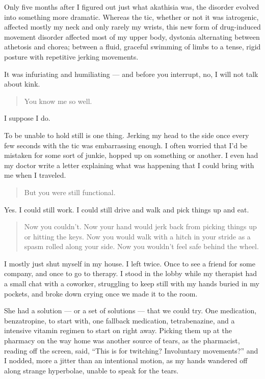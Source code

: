 Only five months after I figured out just what akathisia was, the disorder evolved into something more dramatic. Whereas the tic, whether or not it was iatrogenic, affected mostly my neck and only rarely my wrists, this new form of drug-induced movement disorder affected most of my upper body, dystonia alternating between athetosis and chorea; between a fluid, graceful swimming of limbs to a tense, rigid posture with repetitive jerking movements.

It was infuriating and humiliating --- and before you interrupt, no, I will not talk about kink.

\begin{quote}
You know me so well.
\end{quote}

I suppose I do.

To be unable to hold still is one thing. Jerking my head to the side once every few seconds with the tic was embarrassing enough. I often worried that I'd be mistaken for some sort of junkie, hopped up on something or another. I even had my doctor write a letter explaining what was happening that I could bring with me when I traveled.

\begin{quote}
But you were still functional.
\end{quote}

Yes. I could still work. I could still drive and walk and pick things up and eat.

\begin{quote}
Now you couldn't. Now your hand would jerk back from picking things up or hitting the keys. Now you would walk with a hitch in your stride as a spasm rolled along your side. Now you wouldn't feel safe behind the wheel.
\end{quote}

I mostly just shut myself in my house. I left twice. Once to see a friend for some company, and once to go to therapy. I stood in the lobby while my therapist had a small chat with a coworker, struggling to keep still with my hands buried in my pockets, and broke down crying once we made it to the room.

She had a solution --- or a set of solutions --- that we could try. One medication, benzatropine, to start with, one fallback medication, tetrabenazine, and a intensive vitamin regimen to start on right away. Picking them up at the pharmacy on the way home was another source of tears, as the pharmacist, reading off the screen, said, ``This is for twitching? Involuntary movements?'' and I nodded, more a jitter than an intentional motion, as my hands wandered off along strange hyperbolae, unable to speak for the tears.

